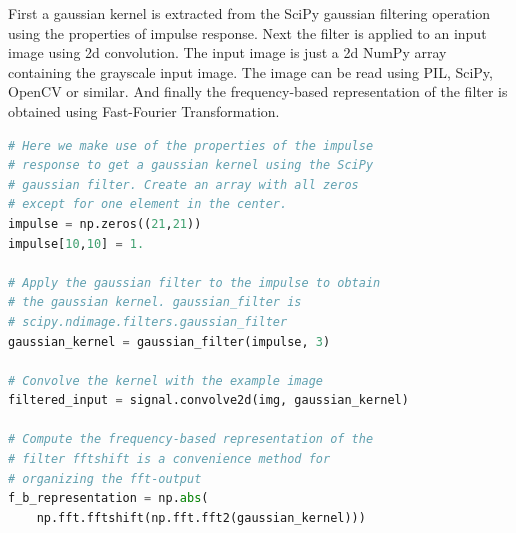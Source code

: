 \documentclass[]{article}
\begin{document}
First a gaussian kernel is extracted from the SciPy gaussian filtering operation
using the properties of impulse response. Next the filter is applied to an input
image using 2d convolution. The input image is just a 2d NumPy array containing
the grayscale input image. The image can be read using PIL, SciPy, OpenCV or
similar. And finally the frequency-based representation of the filter is
obtained using Fast-Fourier Transformation.

\begin{minipage}{\linewidth}
\begin{lstlisting}[language=Python]
# Here we make use of the properties of the impulse
# response to get a gaussian kernel using the SciPy
# gaussian filter. Create an array with all zeros
# except for one element in the center.
impulse = np.zeros((21,21))
impulse[10,10] = 1.

# Apply the gaussian filter to the impulse to obtain
# the gaussian kernel. gaussian_filter is
# scipy.ndimage.filters.gaussian_filter
gaussian_kernel = gaussian_filter(impulse, 3)

# Convolve the kernel with the example image
filtered_input = signal.convolve2d(img, gaussian_kernel)

# Compute the frequency-based representation of the
# filter fftshift is a convenience method for
# organizing the fft-output
f_b_representation = np.abs(
    np.fft.fftshift(np.fft.fft2(gaussian_kernel)))
\end{lstlisting}
\end{minipage}
\end{document}
